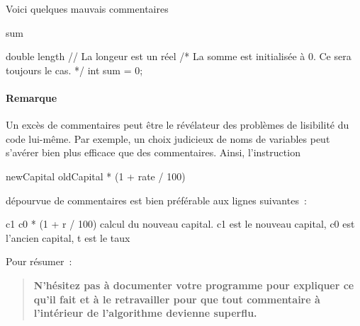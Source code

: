			Voici quelques mauvais 	commentaires
			
			\begin{wrong}
				\begin{pseudocode}
					 
					\Let sum   
				\end{pseudocode}
			\end{wrong}

				\begin{java}
double length 		// La longeur est un réel
/* La somme est initialisée à 0. 
   Ce sera toujours le cas. */
int sum = 0;
				\end{java}
		
				\paragraph{Remarque}

				Un excès de commentaires peut être le révélateur des problèmes
				de lisibilité du code lui-même.  Par exemple, un choix judicieux
				de noms de variables peut s’avérer bien plus efficace que des
				commentaires.  Ainsi, l’instruction
	
			\begin{correct}
				\begin{pseudocode}
				\Let newCapital \Gets oldCapital * (1 + rate / 100)
				\end{pseudocode}
			\end{correct}
	
			dépourvue de commentaires est bien préférable aux lignes suivantes~:
	
			\begin{wrong}
				\begin{pseudocode}
				\Let c1 \Gets c0 * (1 + r / 100) \RComment calcul du nouveau capital\quad.
				\Empty \RComment c1 est le nouveau capital, c0 est l’ancien capital, t est le taux
				\end{pseudocode}
			\end{wrong}
			
			\bigskip
			Pour résumer~:
			\begin{quote}
				\bfseries
				N’hésitez pas à documenter votre programme 
				pour expliquer ce qu’il fait
				et à le retravailler pour que tout
				commentaire à l’intérieur de l’algorithme
				devienne superflu.
			\end{quote}

